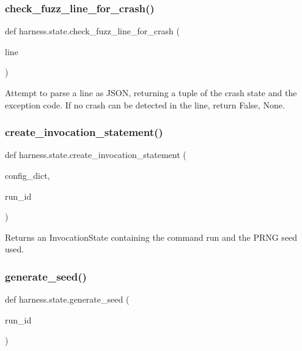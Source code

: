 \subsubsection{\texorpdfstring{check\+\_\+fuzz\+\_\+line\+\_\+for\+\_\+crash()}{check\_fuzz\_line\_for\_crash()}}
{\footnotesize\ttfamily def harness.\+state.\+check\+\_\+fuzz\+\_\+line\+\_\+for\+\_\+crash (\begin{DoxyParamCaption}\item[{}]{line }\end{DoxyParamCaption})}

\begin{DoxyVerb}Attempt to parse a line as JSON, returning a tuple of the crash state
and the exception code. If no crash can be detected in the line, return
False, None.
\end{DoxyVerb}
 \mbox{\label{namespaceharness_1_1state_a398bfd8a9197dda72c0e5cbe319c82fc}} 
\subsubsection{\texorpdfstring{create\+\_\+invocation\+\_\+statement()}{create\_invocation\_statement()}}
{\footnotesize\ttfamily def harness.\+state.\+create\+\_\+invocation\+\_\+statement (\begin{DoxyParamCaption}\item[{}]{config\+\_\+dict,  }\item[{}]{run\+\_\+id }\end{DoxyParamCaption})}

\begin{DoxyVerb}Returns an InvocationState containing the command run
and the PRNG seed used.
\end{DoxyVerb}
 \mbox{\label{namespaceharness_1_1state_a43f6639ae1d3bfc4444f331960a67855}} 
\subsubsection{\texorpdfstring{generate\+\_\+seed()}{generate\_seed()}}
{\footnotesize\ttfamily def harness.\+state.\+generate\+\_\+seed (\begin{DoxyParamCaption}\item[{}]{run\+\_\+id }\end{DoxyParamCaption})}

